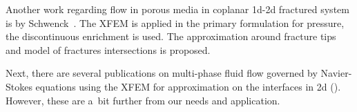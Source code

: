Another work regarding flow in porous media in coplanar 1d-2d fractured system is by Schwenck~\cite{schwenck_xfem-based_2015, schwenck_2015}.
The XFEM is applied in the primary formulation for pressure, the discontinuous enrichment is used.
The approximation around fracture tips and model of fractures intersections is proposed.

Next, there are several publications on multi-phase fluid flow governed by Navier-Stokes equations using the XFEM for
approximation on the interfaces in 2d (\cite{diez_stable_2013,sauerland_stable_2013}). However, these are
a~bit further from our needs and application.

